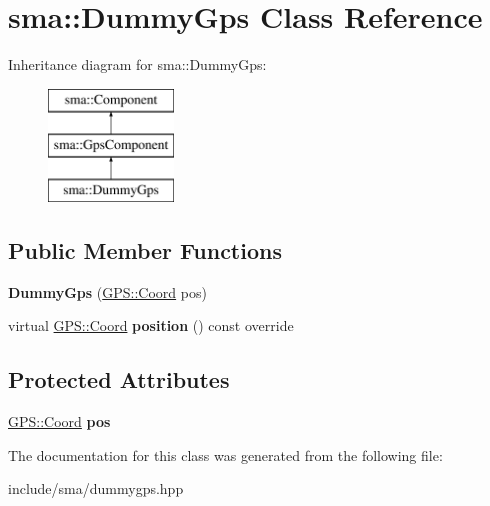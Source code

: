 \hypertarget{classsma_1_1DummyGps}{\section{sma\-:\-:Dummy\-Gps Class Reference}
\label{classsma_1_1DummyGps}
}
Inheritance diagram for sma\-:\-:Dummy\-Gps\-:\begin{figure}[H]
\begin{center}
\leavevmode
\includegraphics[height=3.000000cm]{classsma_1_1DummyGps}
\end{center}
\end{figure}
\subsection*{Public Member Functions}
\begin{DoxyCompactItemize}
\item 
\hypertarget{classsma_1_1DummyGps_acf3e9fee23aebea4ef1cf6dd3cd142f5}{{\bfseries Dummy\-Gps} (\hyperlink{structsma_1_1GPS_1_1Coord}{G\-P\-S\-::\-Coord} pos)}\label{classsma_1_1DummyGps_acf3e9fee23aebea4ef1cf6dd3cd142f5}

\item 
\hypertarget{classsma_1_1DummyGps_ab18a3ca382c38d9bb4b50b4ff2ff9fd3}{virtual \hyperlink{structsma_1_1GPS_1_1Coord}{G\-P\-S\-::\-Coord} {\bfseries position} () const override}\label{classsma_1_1DummyGps_ab18a3ca382c38d9bb4b50b4ff2ff9fd3}

\end{DoxyCompactItemize}
\subsection*{Protected Attributes}
\begin{DoxyCompactItemize}
\item 
\hypertarget{classsma_1_1DummyGps_a917596110e31f16a4363d3534444f6e9}{\hyperlink{structsma_1_1GPS_1_1Coord}{G\-P\-S\-::\-Coord} {\bfseries pos}}\label{classsma_1_1DummyGps_a917596110e31f16a4363d3534444f6e9}

\end{DoxyCompactItemize}


The documentation for this class was generated from the following file\-:\begin{DoxyCompactItemize}
\item 
include/sma/dummygps.\-hpp\end{DoxyCompactItemize}
